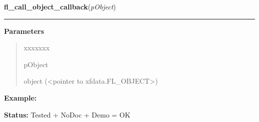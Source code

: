 \hspace{.8\funcindent}\begin{boxedminipage}{\funcwidth}

    \raggedright \textbf{fl\_call\_object\_callback}(\textit{pObject})

    \vspace{-1.5ex}

    \rule{\textwidth}{0.5\fboxrule}
\setlength{\parskip}{2ex}
\setlength{\parskip}{1ex}
      \textbf{Parameters}
      \vspace{-1ex}

      \begin{quote}
        \begin{Ventry}{xxxxxxx}

          \item[pObject]

          object ({\textless}pointer to xfdata.FL\_OBJECT{\textgreater})

        \end{Ventry}

      \end{quote}

\textbf{Example:} 

\textbf{Status:} Tested + NoDoc + Demo = OK



    \end{boxedminipage}

    \label{xformslib:library:fl_set_object_prehandler}

    \vspace{0.5ex}

